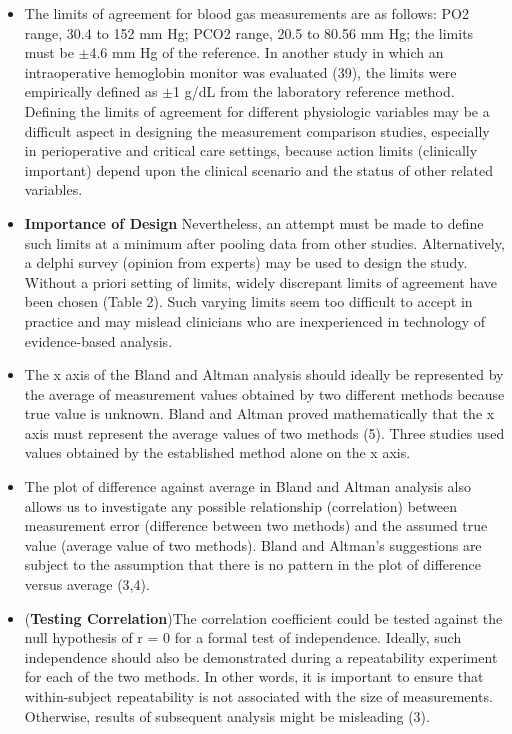 \documentclass[MAIN.tex]{subfiles}
\begin{document}
\begin{itemize}
		\item 
		The limits of agreement for blood gas measurements are as follows: PO2 range, 30.4 to 152 mm Hg; PCO2 range, 20.5 to 80.56 mm Hg; the limits must be $\pm$4.6 mm Hg of the reference. In another study in which an intraoperative hemoglobin monitor was evaluated (39), the limits were empirically defined as $\pm$1 g/dL from the laboratory reference method. Defining the limits of agreement for different physiologic variables may be a difficult aspect in designing the measurement comparison studies, especially in perioperative and critical care settings, because action limits (clinically important) depend upon the clinical scenario and the status of other related variables. 
		\item \textbf{Importance of Design}
		Nevertheless, an attempt must be made to define such limits at a minimum after pooling data from other studies. Alternatively, a delphi survey (opinion from experts) may be used to design the study. Without a priori setting of limits, widely discrepant limits of agreement have been chosen (Table 2). Such varying limits seem too difficult to accept in practice and may mislead clinicians who are inexperienced in technology of evidence-based analysis.
		\item The x axis of the Bland and Altman analysis should ideally be represented by the average of measurement values obtained by two different methods because true value is unknown. Bland and Altman proved mathematically that the x axis must represent the average values of two methods (5). Three studies used values obtained by the established method alone on the x axis.
		\item The plot of difference against average in Bland and Altman analysis also allows us to investigate any possible relationship (correlation) between measurement error (difference between two methods) and the assumed true value (average value of two methods). 
		Bland and Altman’s suggestions are subject to the assumption that there is no pattern in the plot of difference versus average (3,4). 
		\item (\textbf{Testing Correlation})The correlation coefficient could be tested against the null hypothesis of r = 0 for a formal test of independence. Ideally, such independence should also be demonstrated during a repeatability experiment for each of the two methods. In other words, it is important to ensure that within-subject repeatability is not associated with the size of measurements. Otherwise, results of subsequent analysis might be misleading (3).
	\end{itemize}
	
\end{document}
